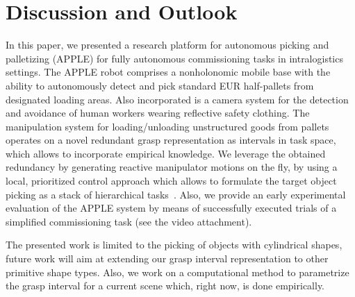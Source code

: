\section{Discussion and Outlook}
\label{sec:discussion}
%
In this paper, we presented a research platform for autonomous picking and palletizing (APPLE) for
fully autonomous commissioning tasks in intralogistics settings. The APPLE robot comprises a
nonholonomic mobile base with the ability to autonomously detect and pick standard EUR half-pallets
from designated loading areas. Also incorporated is a camera system for the detection and avoidance
of human workers wearing reflective safety clothing. The manipulation system for loading/unloading
unstructured goods from pallets operates on a novel redundant grasp representation as intervals in
task space, which allows to incorporate empirical knowledge. We leverage the obtained redundancy by
generating reactive manipulator motions on the fly, by using a local, prioritized control approach
which allows to formulate the target object picking as a stack of hierarchical
tasks~\cite{Kano11}. Also, we provide an early experimental evaluation of the APPLE system by means
of successfully executed trials of a simplified commissioning task (see the video attachment).

The presented work is limited to the picking of objects with cylindrical shapes, future work will
aim at extending our grasp interval representation to other primitive shape types. Also, we work on
a computational method to parametrize the grasp interval for a current scene which, right now, is
done empirically.



